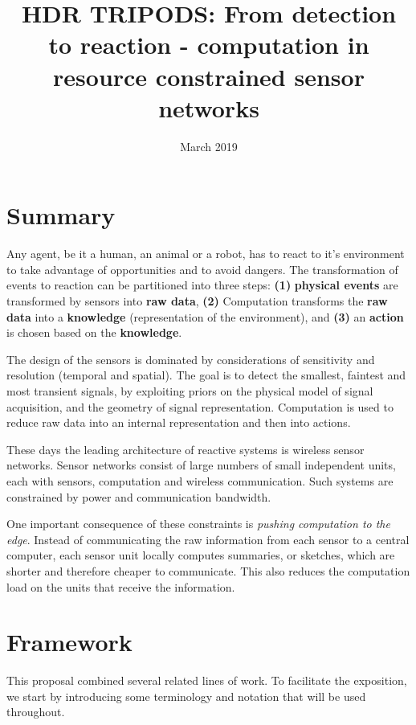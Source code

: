 \documentclass{article}
\title{HDR TRIPODS: From detection to reaction - computation in resource constrained sensor networks}
\date{March 2019}
\begin{document}
\maketitle

\section{Summary}
Any agent, be it a human, an animal or a robot, has to react to it's environment to take advantage of opportunities and to avoid dangers. The transformation of events to reaction can be partitioned into three steps: {\bf(1)} {\bf physical events} are transformed by sensors into {\bf raw data}, {\bf (2)} Computation transforms the {\bf raw data} into a {\bf knowledge} (representation of the environment), and {\bf (3)} an {\bf action} is chosen based on the {\bf knowledge}.

The design of the sensors is dominated by considerations of sensitivity and resolution (temporal and spatial).  The goal is to detect the smallest, faintest and most transient signals,
by exploiting priors on the physical model of signal acquisition, and the geometry of signal representation. Computation is used to reduce raw data into an internal representation and then into actions. 

These days the leading architecture of reactive systems is wireless sensor networks. Sensor networks consist of large numbers of small independent units, each with sensors, computation and wireless communication. Such systems are constrained by power and communication bandwidth. 

One important consequence of these constraints is {\em pushing computation to the edge}. Instead of communicating the raw information from each sensor to a central computer, each sensor unit locally computes summaries, or sketches, which are shorter and therefore cheaper to communicate. This also reduces the computation load on the units that receive the information.

\section{Framework}
\newcommand{\state}{\theta}
\newcommand{\estate}{\hat{\theta}}
\newcommand{\signal}{x}
\newcommand{\dtime}{t}
\newcommand{\ctime}{\tau}

This proposal combined several related lines of work. To facilitate the exposition, we start by introducing some terminology and notation that will be used throughout.
\end{document}
